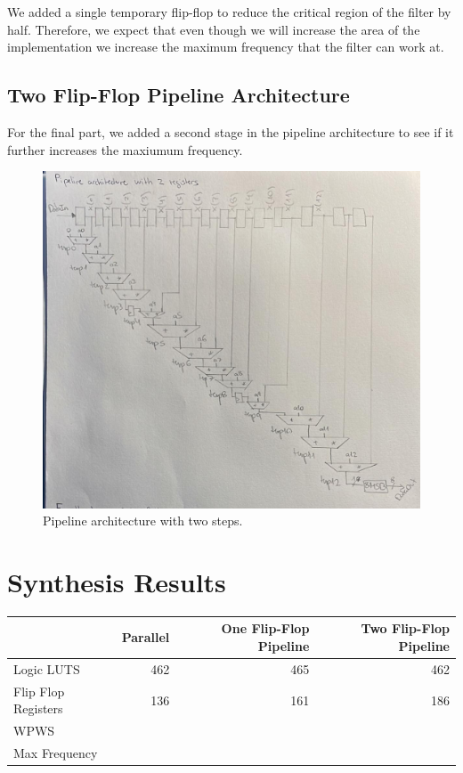 \documentclass[a4paper, 12pt]{article}
\begin{document}
We added a single temporary flip-flop to reduce the critical region of the filter by half. Therefore, we expect that even though we will increase the area of the implementation we increase the maximum frequency that the filter can work at.
\subsection{Two Flip-Flop Pipeline Architecture}
\label{sec:orgd778deb}

For the final part, we added a second stage in the pipeline architecture to see if it further increases the maxiumum frequency.

\begin{figure}[htbp]
\centering
\includegraphics[width=.9\linewidth]{./img/architecture_pipeline.jpg}
\caption{Pipeline architecture with two steps.}
\end{figure}
\section{Synthesis Results}
\label{sec:org1ec4956}

\begin{center}
\begin{tabular}{lrrr}
 & Parallel & One Flip-Flop Pipeline & Two Flip-Flop Pipeline\\
\hline
Logic LUTS & 462 & 465 & 462\\
Flip Flop Registers & 136 & 161 & 186\\
WPWS &  &  & \\
Max Frequency &  &  & \\
\end{tabular}
\end{center}
\end{document}
